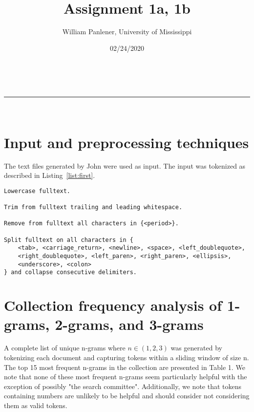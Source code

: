 \documentclass[a4paper,11pt]{article}
\makeatletter
\newcommand{\linia}{\rule{\linewidth}{0.5pt}}
\theoremstyle{mytheor}
\renewcommand{\maketitle}{
\begin{center}
\vspace{2ex}
{\huge \textsc{\@title}}
\vspace{1ex}
\\
\linia\\
\@author \hfill \@date
\vspace{4ex}
\end{center}
}
\makeatother
\begin{document}
\title{Assignment \textnumero{} 1a, 1b}

\author{William Panlener, University of Mississippi}

\date{02/24/2020}

\maketitle

\section*{Input and preprocessing techniques}

The text files generated by John were used as input. The input was tokenized as described in Listing~\ref{list:first}.

\begin{lstlisting}[label={list:first},caption=Tokenizer]
Lowercase fulltext.

Trim from fulltext trailing and leading whitespace.

Remove from fulltext all characters in {<period>}.

Split fulltext on all characters in {
	<tab>, <carriage_return>, <newline>, <space>, <left_doublequote>,
	<right_doublequote>, <left_paren>, <right_paren>, <ellipsis>,
	<underscore>, <colon>
} and collapse consecutive delimiters.

\end{lstlisting}

\section*{Collection frequency analysis of 1-grams, 2-grams, and 3-grams}
A complete list of unique n-grams where $n \in (1,2,3)$ was generated by tokenizing each document and capturing tokens within a sliding window of size n. The top 15 most frequent n-grams in the collection are presented in Table 1. We note that none of these most frequent n-grams seem particularly helpful with the exception of possibly "the search committee". Additionally, we note that tokens containing numbers are unlikely to be helpful and should consider not considering them as valid tokens.
\end{document}
